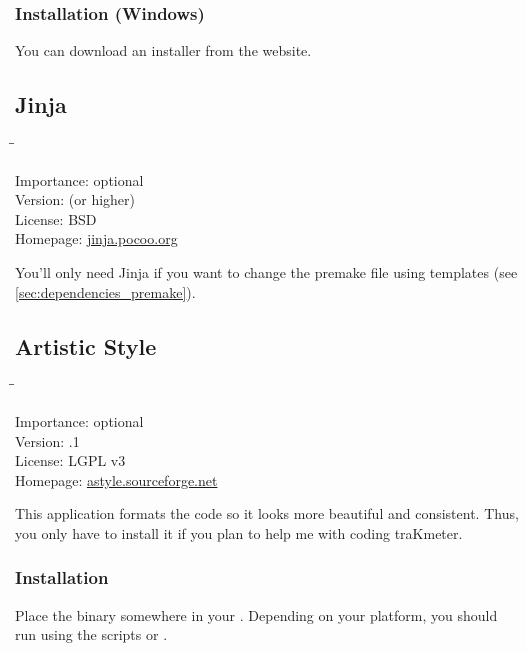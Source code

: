 \subsubsection{Installation (Windows)}

You can download an installer from the website.

\subsection{Jinja}

\begin{tabbing}
  \hspace*{6em}\=\=\kill

  Importance:  \> optional \\
  Version:      (or higher) \\
  License:     \> BSD \\
  Homepage:    \> \href{http://jinja.pocoo.org/}{jinja.pocoo.org}
\end{tabbing}

You'll only need Jinja if you want to change the premake file using
templates (see \ref{sec:dependencies_premake}).

\subsection{Artistic Style}

\begin{tabbing}
  \hspace*{6em}\=\=\kill

  Importance:  \> optional \\
  Version:     .1 \\
  License:     \> LGPL v3 \\
  Homepage:    \> \href{http://astyle.sourceforge.net/}{astyle.sourceforge.net}
\end{tabbing}

This application formats the code so it looks more beautiful and
consistent.  Thus, you only have to install it if you plan to help me
with coding traKmeter.

\subsubsection{Installation}

Place the binary somewhere in your .  Depending on your
platform, you should run  using the scripts
 or .

